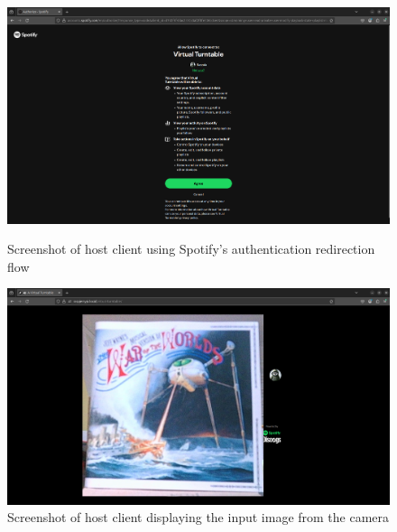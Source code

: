 \begin{uomappendix}
            \begin{figure}[H]
                \centering
                \begin{minipage}[b]{0.45\textwidth}
                    \centering
                    \includegraphics[width=\textwidth]{images/screenshots/HOST_Auth.png}
                    \caption{Screenshot of host client using Spotify's authentication redirection flow}
                    \label{fig:hostAuth}
                \end{minipage}
                \hfill
                \begin{minipage}[b]{0.45\textwidth}
                    \centering
                    \includegraphics[width=\textwidth]{images/screenshots/HOST_Cam.png}
                    \caption{Screenshot of host client displaying the input image from the camera}
                    \label{fig:hostCam}
                \end{minipage}
            \end{figure}
                

\end{uomappendix}
